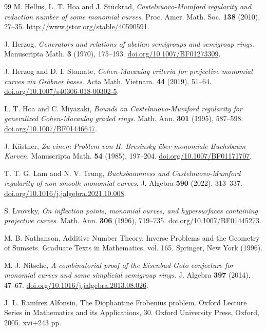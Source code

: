 \documentclass[11pt]{article}
\theoremstyle{remark}
\theoremstyle{definition}
\begin{document}
\begin{thebibliography}{99}
   M. Hellus, L. T. Hoa and J. St\"uckrad, {\it Castelnuovo-Mumford regularity and reduction number of some monomial curves}.  Proc. Amer. Math. Soc. {\bf 138} (2010), 27--35. \url{http://www.jstor.org/stable/40590591}.
  
   J.  Herzog, {\it Generators and relations of abelian semigroups and semigroup rings}. Manuscripta Math. {\bf 3} (1970), 175--193. \href{https://doi.org/10.1007/BF01273309}{doi.org/10.1007/BF01273309}.
 
    J. Herzog and D. I. Stamate, {\it Cohen-Macaulay criteria for projective monomial curves via Gr\"obner bases}. Acta Math. Vietnam.  {\bf 44} (2019),  51--64. \href{https://doi.org/10.1007/s40306-018-00302-5}{doi.org/10.1007/s40306-018-00302-5}.
   
     L. T. Hoa and C. Miyazaki, {\it Bounds on Castelnuovo-Mumford regularity for generalized Cohen-Macaulay graded rings}. Math. Ann. {\bf 301} (1995), 587--598. \href{https://doi.org/10.1007/BF01446647}{doi.org/10.1007/BF01446647}.
   
  J. K\"astner, {\it Zu einem Problem von H. Bresinsky \"uber monomiale Buchsbaum Kurven}.
Manuscripta Math. {\bf 54} (1985), 197--204. \href{https://doi.org/10.1007/BF01171707}{doi.org/10.1007/BF01171707}.

 T. T. G. Lam and  N. V. Trung, {\it Buchsbaumness and Castelnuovo-Mumford regularity of non-smooth monomial curves}. J. Algebra {\bf 590} (2022), 313--337. \href{https://doi.org/10.1016/j.jalgebra.2021.10.008}{doi.org/10.1016/j.jalgebra.2021.10.008}.
 
  S. Lvovsky, {\it On inflection points, monomial curves, and hypersurfaces containing projective curves}. Math. Ann. {\bf 306} (1996),  719--735. \href{https://doi.org/10.1007/BF01445273}{doi.org/10.1007/BF01445273}.
 
  M. B. Nathanson,  Additive Number Theory. Inverse Problems and the Geometry of Sumsets. Graduate Texts in Mathematics, vol. 165. Springer, New York (1996).
 
  M. J. Nitsche, {\it A combinatorial proof of the Eisenbud-Goto conjecture for monomial curves and some simplicial semigroup rings}.  J. Algebra {\bf 397} (2014), 47--67. \href{https://doi.org/10.1016/j.jalgebra.2013.08.026}{doi.org/10.1016/j.jalgebra.2013.08.026}.
 
  J. L. Ram\'irez Alfonsin, The Diophantine Frobenius problem. Oxford Lecture Series in Mathematics and its Applications, 30. Oxford University Press, Oxford, 2005. xvi+243 pp. 
  

\end{thebibliography}
\end{document}
